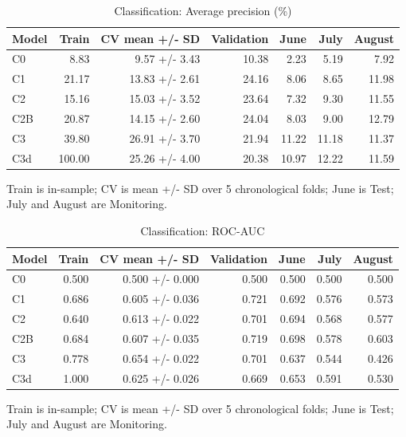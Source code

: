 \begin{table}[htbp]
\centering
\small
\caption{Classification: Average precision (\%)}
\begin{tabular}{lrrrrrr}
\toprule
Model & Train & CV mean +/- SD & Validation & June & July & August \\
\midrule
C0 & 8.83 & 9.57 +/- 3.43 & 10.38 & 2.23 & 5.19 & 7.92 \\
C1 & 21.17 & 13.83 +/- 2.61 & 24.16 & 8.06 & 8.65 & 11.98 \\
C2 & 15.16 & 15.03 +/- 3.52 & 23.64 & 7.32 & 9.30 & 11.55 \\
C2B & 20.87 & 14.15 +/- 2.60 & 24.04 & 8.03 & 9.00 & 12.79 \\
C3 & 39.80 & 26.91 +/- 3.70 & 21.94 & 11.22 & 11.18 & 11.37 \\
C3d & 100.00 & 25.26 +/- 4.00 & 20.38 & 10.97 & 12.22 & 11.59 \\
\bottomrule
\end{tabular}
\par\smallskip\begin{minipage}{\linewidth}\footnotesize Train is in-sample; CV is mean +/- SD over 5 chronological folds; June is Test; July and August are Monitoring.\end{minipage}
\end{table}


\begin{table}[htbp]
\centering
\small
\caption{Classification: ROC-AUC}
\begin{tabular}{lrrrrrr}
\toprule
Model & Train & CV mean +/- SD & Validation & June & July & August \\
\midrule
C0 & 0.500 & 0.500 +/- 0.000 & 0.500 & 0.500 & 0.500 & 0.500 \\
C1 & 0.686 & 0.605 +/- 0.036 & 0.721 & 0.692 & 0.576 & 0.573 \\
C2 & 0.640 & 0.613 +/- 0.022 & 0.701 & 0.694 & 0.568 & 0.577 \\
C2B & 0.684 & 0.607 +/- 0.035 & 0.719 & 0.698 & 0.578 & 0.603 \\
C3 & 0.778 & 0.654 +/- 0.022 & 0.701 & 0.637 & 0.544 & 0.426 \\
C3d & 1.000 & 0.625 +/- 0.026 & 0.669 & 0.653 & 0.591 & 0.530 \\
\bottomrule
\end{tabular}
\par\smallskip\begin{minipage}{\linewidth}\footnotesize Train is in-sample; CV is mean +/- SD over 5 chronological folds; June is Test; July and August are Monitoring.\end{minipage}
\end{table}


